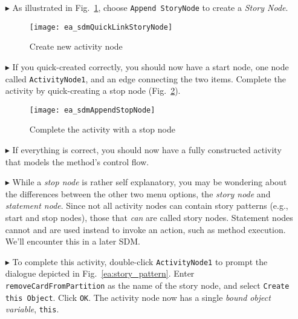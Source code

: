 \begin{itemize}
\item[$\blacktriangleright$] As illustrated in Fig.~\ref{ea:sdm_new_activity_node}, choose \texttt{Append StoryNode} to create a \emph{Story Node}.

\begin{figure}[htp]
\begin{center}
  \texttt{[image: ea\_sdmQuickLinkStoryNode]}
  \caption{Create new activity node}  
  \label{ea:sdm_new_activity_node}
\end{center}
\end{figure}

\item[$\blacktriangleright$] If you quick-created correctly, you should now have a start node, one node called \texttt{ActivityNode1}, and an edge
connecting the two items. Complete the activity by quick-creating a stop node (Fig.~\ref{ea:sdm_stop_node}).

\begin{figure}[htp]
\begin{center}
  \texttt{[image: ea\_sdmAppendStopNode]}
  \caption{Complete the activity with a stop node}  
  \label{ea:sdm_stop_node}
\end{center}
\end{figure}

\vspace{0.5cm}

\item[$\blacktriangleright$] If everything is correct, you should now have a fully constructed activity that models the method's control flow.

\item[$\blacktriangleright$] While a \emph{stop node} is rather self explanatory, you may be wondering about the differences between the other two menu options,
the \emph{story node} and \emph{statement node}. Since not all activity nodes can contain story patterns (e.g., start
and stop nodes), those that \emph{can} are called story nodes. Statement nodes cannot and are used instead to invoke an action, such as method execution. We'll
encounter this in a later SDM.

\item[$\blacktriangleright$] To complete this activity, double-click \texttt{ActivityNode1} to prompt the dialogue depicted in
Fig.~\ref{ea:story_pattern}. Enter \texttt{removeCardFromPartition} as the name of the story node, and select \texttt{Create this Object}.  Click
\texttt{OK}. The activity node now has a single \emph{bound} \emph{object variable}, \texttt{this}.


\end{itemize}
